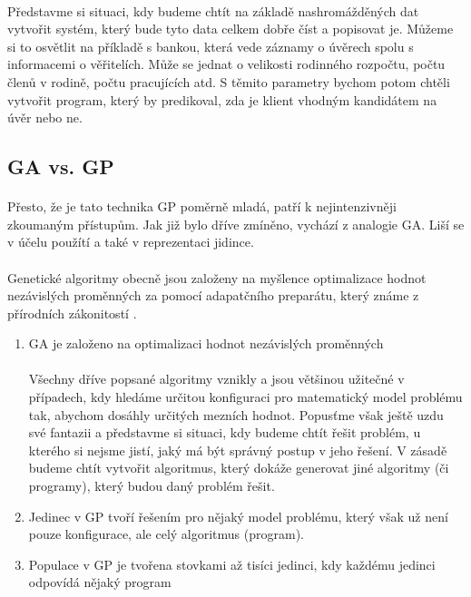 \documentclass[bc,male,java,dept460]{diploma}		%
\begin{document}
\paragraph*{}
Představme si situaci, kdy budeme chtít na základě nashromážděných dat vytvořit systém, který bude tyto data celkem dobře číst a popisovat je. Můžeme si to osvětlit na příkladě s bankou, která vede záznamy o úvěrech spolu s informacemi o věřitelích. Může se jednat o velikosti rodinného rozpočtu, počtu členů v rodině, počtu pracujících atd. S těmito parametry bychom potom chtěli vytvořit program, který by predikoval, zda je klient vhodným kandidátem na úvěr nebo ne.

\subsection{GA vs. GP}
\paragraph*{}
Přesto, že je tato technika GP poměrně mladá, patří k nejintenzivněji zkoumaným přístupům. Jak již bylo dříve zmíněno, vychází z analogie GA. Liší se v účelu použítí a také v reprezentaci jidince.

\paragraph*{}
Genetické algoritmy obecně jsou založeny na myšlence optimalizace hodnot nezávislých proměnných za pomocí adapatčního preparátu, který známe z přírodních zákonitostí \cite{evoltech}.

\begin{enumerate}
\item GA je založeno na optimalizaci hodnot nezávislých proměnných
\paragraph*{}
Všechny dříve popsané algoritmy vznikly a jsou většinou užitečné v případech, kdy hledáme určitou konfiguraci pro matematický model problému tak, abychom dosáhly určitých mezních hodnot. Popusťme však ještě uzdu své fantazii a představme si situaci, kdy budeme chtít řešit problém, u kterého si nejsme jistí, jaký má být správný postup v jeho řešení. V zásadě budeme chtít vytvořit algoritmus, který dokáže generovat jiné algoritmy (či programy), který budou daný problém řešit.

\item Jedinec v GP tvoří řešením pro nějaký model problému, který však už není pouze konfigurace, ale celý algoritmus (program).

\item Populace v GP je tvořena stovkami až tisíci jedinci, kdy každému jedinci odpovídá nějaký program
\end{enumerate}
\end{document}
